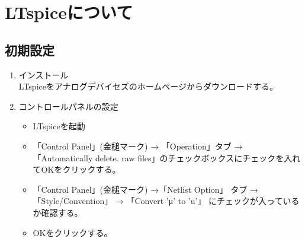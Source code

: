 \section{LTspiceについて}
\subsection{初期設定}
\begin{enumerate}
  \setlength{\parskip}{0cm} %
  \setlength{\itemsep}{0cm} %
  \item インストール \\
  LTspiceをアナログデバイセズのホームページからダウンロードする。
  \item コントロールパネルの設定
  \begin{itemize}
    \setlength{\parskip}{0cm} %
    \setlength{\itemsep}{0cm} %
    \item LTspiceを起動
    \item 「Control Panel」(金槌マーク) → 「Operation」タブ → 「Automatically delete. raw files」のチェックボックスにチェックを入れてOKをクリックする。
    \item 「Control Panel」(金槌マーク) →「Netlist Option」 タブ → 「Style/Convention」 → 「Convert 'μ' to 'u'」 にチェックが入っているか確認する。
    \item OKをクリックする。
  \end{itemize}


\end{enumerate}
